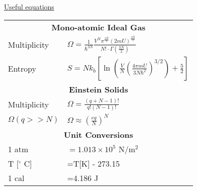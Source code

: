 \begin{multicols}{2}
\begin{minipage}{\columnwidth}
\centering\underline{Useful equations}
\renewcommand{\arraystretch}{2.5}
\begin{tabular}{ll}
	\multicolumn{2}{c}{\textbf{Mono-atomic Ideal Gas}}\\
	Multiplicity & $\Omega=\frac{1}{\hbar^{3N}}\frac{V^N\pi^{\frac{3N}{2}}\left(2mU\right)^\frac{3N}{2}}{N!\cdot\Gamma(\frac{3N}{2})}$\\
	Entropy & $S=Nk_b\left[\ln\left(\frac{V}{N}\left(\frac{4\pi mU}{3N\hbar^2}\right)^{3/2}\right)+\frac{5}{2}\right]$\\
	\multicolumn{2}{c}{\textbf{Einstein Solids}}\\
	Multiplicity & $\Omega=\frac{\left(q+N-1\right)!}{q!\left(N-1\right)!}$\\
	$\Omega(q>>N)$&$\Omega\approx\left(\frac{eq}{N}\right)^N$\\
	\multicolumn{2}{c}{\textbf{Unit Conversions}}\\
	1 atm & $=1.013\times10^5$ N/m$^2$\\
	T [$^\circ$ C] & =T[K] - 273.15\\
	1 cal&=4.186 J\\
\end{tabular}
\end{minipage}

\end{multicols}